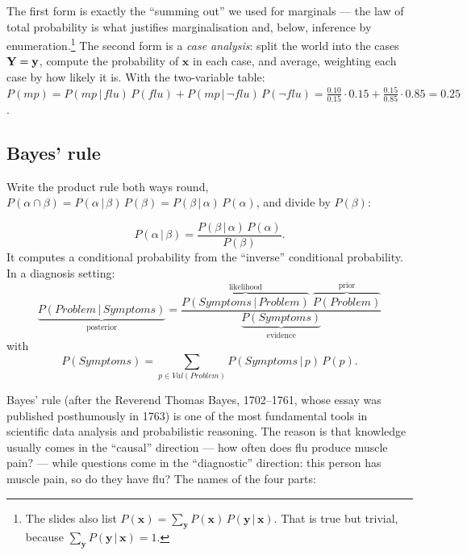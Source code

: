 \documentclass[11pt, oneside]{book}
\newcommand{\Prob}{\mathbb{P}}           %
\newcommand{\given}{\,\vert\,}           %
\newcommand{\Val}{\mathit{Val}}          %
\newcommand{\bx}{\mathbf{x}}  \newcommand{\by}{\mathbf{y}}
\newcommand{\vn}[1]{\mathit{#1}}         %
\let\originalsubsection\subsection
\renewcommand{\subsection}{\Needspace{6\baselineskip}\originalsubsection}
\begin{document}
The first form is exactly the ``summing out'' we used for marginals --- the law
of total probability is what justifies marginalisation and, below, inference
by enumeration.\footnote{The slides also list $P(\bx) = \sum_{\by}
P(\bx)\,P(\by \given \bx)$. That is true but trivial, because
$\sum_{\by} P(\by \given \bx) = 1$.} The second form is a \emph{case
analysis}: split the world into the cases $\bY = \by$, compute the probability
of $\bx$ in each case, and average, weighting each case by how likely it is.
With the two-variable table:
$P(\vn{mp}) = P(\vn{mp} \given \vn{flu})\,P(\vn{flu}) + P(\vn{mp} \given
\neg\vn{flu})\,P(\neg\vn{flu}) = \tfrac{0.10}{0.15} \cdot 0.15 +
\tfrac{0.15}{0.85} \cdot 0.85 = 0.25$.

\subsection{Bayes' rule}

Write the product rule both ways round, $P(\alpha \cap \beta) =
P(\alpha \given \beta)\,P(\beta) = P(\beta \given \alpha)\,P(\alpha)$, and
divide by $P(\beta)$:

\begin{thmbox}[title={Bayes' rule}, unbreakable]
\[
P(\alpha \given \beta) = \frac{P(\beta \given \alpha)\, P(\alpha)}{P(\beta)} .
\]
It computes a conditional probability from the ``inverse'' conditional
probability. In a diagnosis setting:
\[
\underbrace{P(\vn{Problem} \given \vn{Symptoms})}_{\text{posterior}}
= \frac{\overbrace{P(\vn{Symptoms} \given \vn{Problem})}^{\text{likelihood}}
        \;\overbrace{P(\vn{Problem})}^{\text{prior}}}
       {\underbrace{P(\vn{Symptoms})}_{\text{evidence}}}
\]
with
\[
P(\vn{Symptoms}) = \sum_{p \in \Val(\vn{Problem})} P(\vn{Symptoms} \given p)\, P(p).
\]
\end{thmbox}

Bayes' rule (after the Reverend Thomas Bayes, 1702--1761, whose essay was
published posthumously in 1763) is one of the most fundamental tools in
scientific data analysis and probabilistic reasoning. The reason is that
knowledge usually comes in the ``causal'' direction --- how often does flu
produce muscle pain? --- while questions come in the ``diagnostic'' direction:
this person has muscle pain, so do they have flu? The names of the four parts:
\end{document}
